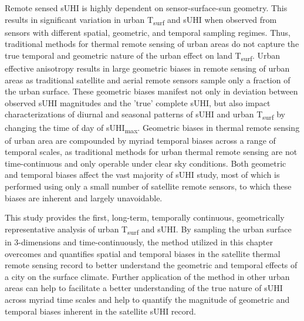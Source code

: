 \begin{bibunit}
Remote sensed sUHI is highly dependent on sensor-surface-sun geometry. This results in significant variation in urban T\textsubscript{surf} and sUHI when observed from sensors with different spatial, geometric, and temporal sampling regimes. Thus, traditional methods for thermal remote sensing of urban areas do not capture the true temporal and geometric nature of the urban effect on land T\textsubscript{surf}. Urban effective anisotropy results in large geometric biases in remote sensing of urban areas as traditional satellite and aerial remote sensors sample only a fraction of the urban surface. These geometric biases manifest not only in deviation between observed sUHI magnitudes and the 'true' complete sUHI, but also impact characterizations of diurnal and seasonal patterns of sUHI and urban T\textsubscript{surf} by changing the time of day of sUHI\textsubscript{max}. Geometric biases in thermal remote sensing of urban area are compounded by myriad temporal biases across a range of temporal scales, as traditional methods for urban thermal remote sensing are not time-continuous and only operable under clear sky conditions. Both geometric and temporal biases affect the vast majority of sUHI study, most of which is performed using only a small number of satellite remote sensors, to which these biases are inherent and largely unavoidable. 

This study provides the first, long-term, temporally continuous, geometrically representative analysis of urban T\textsubscript{surf} and sUHI. By sampling the urban surface in 3-dimensions and time-continuously, the method utilized in this chapter overcomes and quantifies spatial and temporal biases in the satellite thermal remote sensing record to better understand the geometric and temporal effects of a city on the surface climate. Further application of the method in other urban areas can help to facilitate a better understanding of the true nature of sUHI across myriad time scales and help to quantify the magnitude of geometric and temporal biases inherent in the satellite sUHI record.

\cleardoublepage 
{}  
\renewcommand*{\bibname}{References}


\putbib
\end{bibunit}